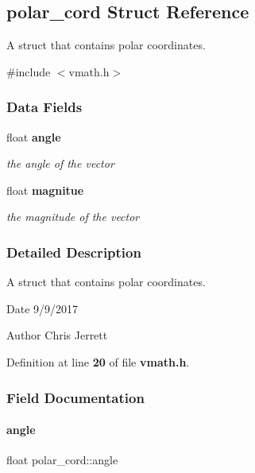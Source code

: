 \subsection{polar\+\_\+cord Struct Reference}
\label{a00195}


A struct that contains polar coordinates.  




{\ttfamily \#include $<$vmath.\+h$>$}

\subsubsection*{Data Fields}
\begin{DoxyCompactItemize}
\item 
float \textbf{ angle}
\begin{DoxyCompactList}\small\item\em the angle of the vector \end{DoxyCompactList}\item 
float \textbf{ magnitue}
\begin{DoxyCompactList}\small\item\em the magnitude of the vector \end{DoxyCompactList}\end{DoxyCompactItemize}


\subsubsection{Detailed Description}
A struct that contains polar coordinates. 

\begin{DoxyDate}{Date}
9/9/2017 
\end{DoxyDate}
\begin{DoxyAuthor}{Author}
Chris Jerrett 
\end{DoxyAuthor}


Definition at line \textbf{ 20} of file \textbf{ vmath.\+h}.



\subsubsection{Field Documentation}
\mbox{\label{a00195_a81b3a11d38d76719b02fcd425adaa216}} 
\paragraph{angle}
{\footnotesize\ttfamily float polar\+\_\+cord\+::angle}



